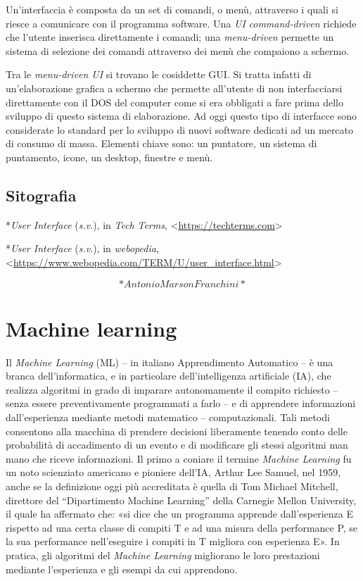 \documentclass[
  b5paper,
  twoside,
  11pt,
  chapterprefix=false,
  bibliography=totocnumbered,
  parskip=0]{scrbook}
\begin{document}
Un'interfaccia è composta da un set di comandi, o menù, attraverso i
quali si riesce a comunicare con il programma software. Una \emph{UI}
\emph{command-driven} richiede che l'utente inserisca direttamente i comandi;
una \emph{menu-driven} permette un sistema di selezione dei comandi
attraverso dei menù che compaiono a schermo.

Tra le \emph{menu-driven UI} si trovano le cosiddette GUI. Si tratta infatti
di un'elaborazione grafica a schermo che permette all'utente di non
interfacciarsi direttamente con il DOS del computer come si era
obbligati a fare prima dello sviluppo di questo sistema di elaborazione.
Ad oggi questo tipo di interfacce sono considerate lo standard per lo
sviluppo di nuovi software dedicati ad un mercato di consumo di massa.
Elementi chiave sono: un puntatore, un sistema di puntamento, icone, un
desktop, finestre e menù.

\hypertarget{sitografia-19}{%
\section*{Sitografia}\label{sitografia-19}}

*\emph{User Interface} (\emph{s.v}.), in \emph{Tech} \emph{Terms},
\textless{}{\href{https://techterms.com/}{https://techterms.com}\textgreater{}}

*\emph{User Interface} (\emph{s.v}.), in \emph{webopedia},
\textless{}\href{https://www.webopedia.com/TERM/U/user_interface.html}{{https://www.webopedia.com/TERM/U/user\_interface.html}}\textgreater{}

\[*Antonio Marson Franchini*\]

\hypertarget{machine-learning}{%
\chapter{Machine learning}\label{machine-learning}}

Il \emph{Machine Learning} (ML) -- in italiano Apprendimento Automatico -- è
una branca dell'informatica, e in particolare dell'intelligenza
artificiale (IA), che realizza algoritmi in grado di imparare
autonomamente il compito richiesto -- senza essere preventivamente
programmati a farlo -- e di apprendere informazioni dall'esperienza
mediante metodi matematico -- computazionali. Tali metodi consentono
alla macchina di prendere decisioni liberamente tenendo conto delle
probabilità di accadimento di un evento e di modificare gli stessi
algoritmi man mano che riceve informazioni. Il primo a coniare il
termine \emph{Machine Learning} fu un noto scienziato americano e pioniere
dell'IA, Arthur Lee Samuel, nel 1959, anche se la definizione oggi più
accreditata è quella di Tom Michael Mitchell, direttore del
\enquote{Dipartimento Machine Learning} della Carnegie Mellon University, il
quale ha affermato che: «si dice che un programma apprende
dall'esperienza E rispetto ad una certa classe di compiti T e ad una
misura della performance P, se la sua performance nell'eseguire i
compiti in T migliora con esperienza E». In pratica, gli algoritmi del
\emph{Machine Learning} migliorano le loro prestazioni mediante l'esperienza
e gli esempi da cui apprendono.~
\end{document}
